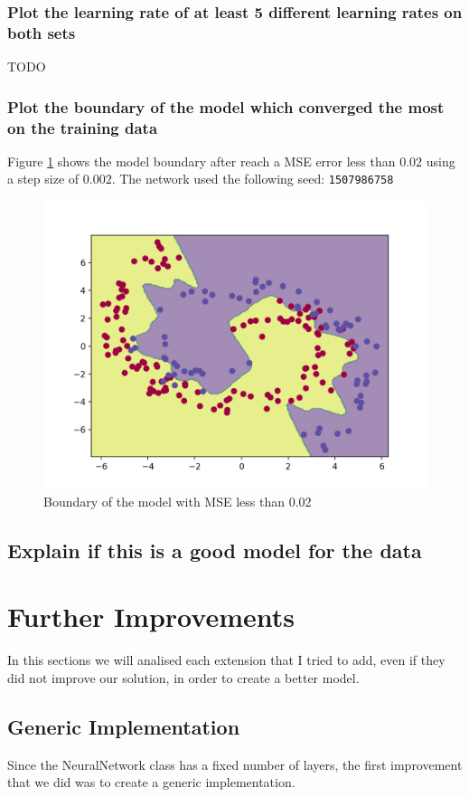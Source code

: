 \documentclass[11pt]{article}
\begin{document}
\subsubsection{Plot the learning rate of at least 5 different learning rates on both sets}
TODO
\subsubsection{Plot the boundary of the model which converged the most on the training data}
Figure \ref{fig: NN_MSE_002_boundary} shows the model boundary after reach a MSE error less than $0.02$ using a step size of $0.002$. The network used the following seed: \texttt{1507986758}
\begin{figure}[H]
\label{fig: NN_MSE_002_boundary}
\centering
\includegraphics[scale=0.5]{images/NN_MSE_002_boundary}	
\caption{Boundary of the model with MSE less than 0.02}
\end{figure}

\subsection{Explain if this is a good model for the data}

\section{Further Improvements}
In this sections we will analised each extension that I tried to add, even if they did not improve our solution, in order to create a better model.
\subsection{Generic Implementation}
Since the NeuralNetwork class has a fixed number of layers, the first improvement that we did was to create a generic implementation.
\end{document}
